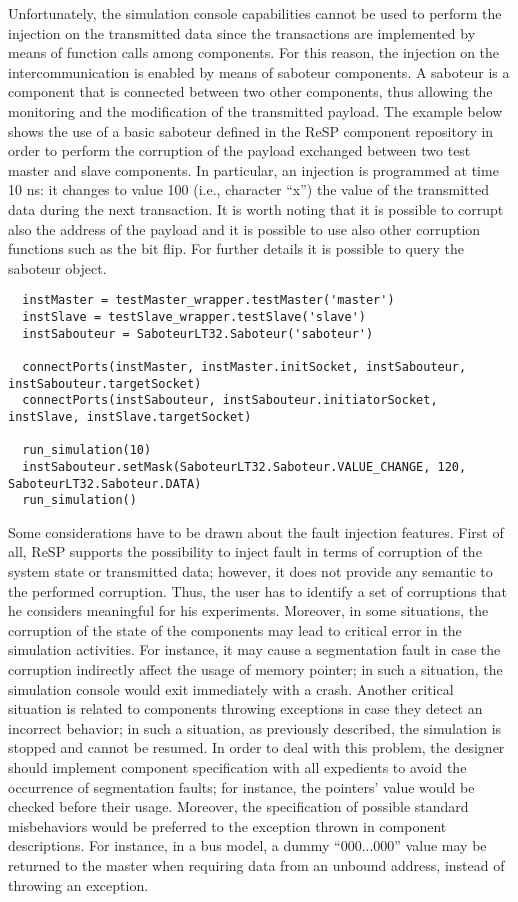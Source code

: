 \indent Unfortunately, the simulation console capabilities cannot be used to perform the injection on the transmitted data since the transactions are implemented by means of function calls among components. For this reason, the injection on the intercommunication is enabled by means of saboteur components. A saboteur is a component that is connected between two other components, thus allowing the monitoring and the modification of the transmitted payload. The example below shows the use of a basic saboteur defined in the ReSP component repository in order to perform the corruption of the payload exchanged between two test master and slave components. In particular, an injection is programmed at time 10 ns: it changes to value 100 (i.e., character ``x'') the value of the transmitted data during the next transaction. It is worth noting that it is possible to corrupt also the address of the payload and it is possible to use also other corruption functions such as the bit flip. For further details it is possible to query the saboteur object.

\scriptsize
\begin{verbatim}
  instMaster = testMaster_wrapper.testMaster('master')
  instSlave = testSlave_wrapper.testSlave('slave')
  instSabouteur = SaboteurLT32.Saboteur('saboteur')

  connectPorts(instMaster, instMaster.initSocket, instSabouteur, instSabouteur.targetSocket)
  connectPorts(instSabouteur, instSabouteur.initiatorSocket, instSlave, instSlave.targetSocket)

  run_simulation(10)
  instSabouteur.setMask(SaboteurLT32.Saboteur.VALUE_CHANGE, 120, SaboteurLT32.Saboteur.DATA)
  run_simulation()
\end{verbatim}
\normalsize

\indent Some considerations have to be drawn about the fault injection features. First of all, ReSP supports the possibility to inject fault in terms of corruption of the system state or transmitted data; however, it does not provide any semantic to the performed corruption. Thus, the user has to identify a set of corruptions that he considers meaningful for his experiments. Moreover, in some situations, the corruption of the state of the components may lead to critical error in the simulation activities. For instance, it may cause a segmentation fault in case the corruption indirectly affect the usage of memory pointer; in such a situation, the simulation console would exit immediately with a crash. Another critical situation is related to components throwing exceptions in case they detect an incorrect behavior; in such a situation, as previously described, the simulation is stopped and cannot be resumed. In order to deal with this problem, the designer should implement component specification with all expedients to avoid the occurrence of segmentation faults; for instance, the pointers' value would be checked before their usage. Moreover, the specification of possible standard misbehaviors would be preferred to the exception thrown in component descriptions. For instance, in a bus model, a dummy ``000...000'' value may be returned to the master when requiring data from an unbound address, instead of throwing an exception.

